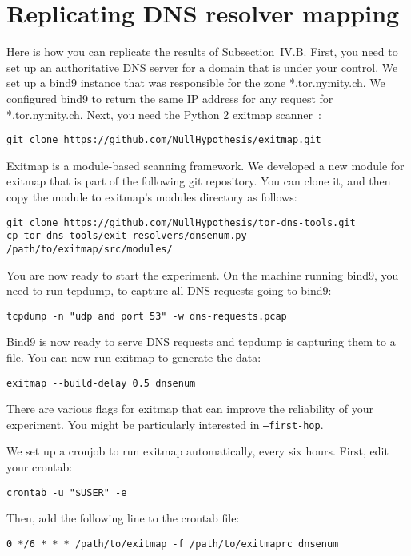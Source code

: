 \documentclass{article}
\begin{document}
\section{Replicating DNS resolver mapping}
Here is how you can replicate the results of Subsection~IV.B.  First, you need
to set up an authoritative DNS server for a domain that is under your control.
We set up a bind9 instance that was responsible for the zone *.tor.nymity.ch.
We configured bind9 to return the same IP address for any request for
*.tor.nymity.ch.  Next, you need the Python 2 exitmap scanner~\cite{exitmap}:

\begin{lstlisting}
git clone https://github.com/NullHypothesis/exitmap.git
\end{lstlisting}

Exitmap is a module-based scanning framework.  We developed a new module for
exitmap that is part of the following git repository.  You can clone it, and
then copy the module to exitmap's modules directory as follows:

\begin{lstlisting}
git clone https://github.com/NullHypothesis/tor-dns-tools.git
cp tor-dns-tools/exit-resolvers/dnsenum.py /path/to/exitmap/src/modules/
\end{lstlisting}

You are now ready to start the experiment.  On the machine running bind9, you
need to run tcpdump, to capture all DNS requests going to bind9:

\begin{lstlisting}
tcpdump -n "udp and port 53" -w dns-requests.pcap
\end{lstlisting}

Bind9 is now ready to serve DNS requests and tcpdump is capturing them to a
file.  You can now run exitmap to generate the data:

\begin{lstlisting}
exitmap --build-delay 0.5 dnsenum
\end{lstlisting}

There are various flags for exitmap that can improve the reliability of your
experiment.  You might be particularly interested in {\tt ---first-hop}.

We set up a cronjob to run exitmap automatically, every six hours.  First, edit
your crontab:
\begin{lstlisting}
crontab -u "$USER" -e
\end{lstlisting}
Then, add the following line to the crontab file:
\begin{lstlisting}
0 */6 * * * /path/to/exitmap -f /path/to/exitmaprc dnsenum
\end{lstlisting}
\end{document}
